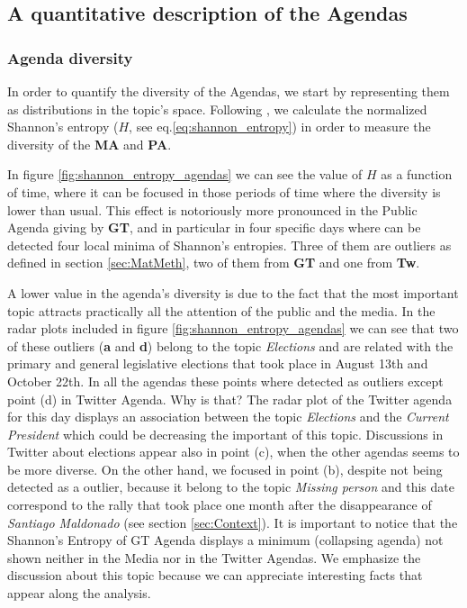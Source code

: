 \documentclass[10pt,letterpaper]{article}
\begin{document}
\subsection*{A quantitative description of the Agendas}

\subsubsection*{Agenda diversity}


\par In order to quantify the diversity of the Agendas, we start by representing them as distributions in the topic's space. 
Following \cite{boydstun2014importance}, we calculate the normalized Shannon's entropy ($H$, see eq.\ref{eq:shannon_entropy}) in order to measure the diversity of the \textbf{MA} and \textbf{PA}.
\par In figure \ref{fig:shannon_entropy_agendas} we can see the value of $H$ as a function of time, where it can be focused in those periods of time where the diversity is lower than usual. This effect is notoriously more pronounced in the Public Agenda giving by \textbf{GT}, and in particular in four specific days  where can be detected four local minima of Shannon's entropies. Three of them are outliers as defined in section \ref{sec:MatMeth}, two of them from \textbf{GT} and one from \textbf{Tw}. 

\par A lower value in the agenda's diversity is due to the fact that the most important topic attracts practically all the attention of the public and the media.
In the radar plots included in figure \ref{fig:shannon_entropy_agendas} we can see that two of these outliers (\textbf{a} and \textbf{d}) belong to the topic \emph{Elections} and are related with the primary and general legislative elections that took place in August 13th and October 22th. 
In all the agendas these points where detected as outliers except point (d) in Twitter Agenda. Why is that? The radar plot of the Twitter agenda for this day displays an association between the topic \emph{Elections} and the \emph{Current President} which could be decreasing the important of this topic.
Discussions in Twitter about elections appear also in point (c), when the other agendas seems to be more diverse. 
On the other hand, we focused in point (b), despite not being detected as a outlier, because it belong to the topic \emph{Missing person} and this date correspond to the rally that took place one month after the disappearance of \emph{Santiago Maldonado} (see section \ref{sec:Context}). It is important to notice that the Shannon's Entropy of GT Agenda displays a minimum (collapsing agenda) not shown neither in the Media nor in the Twitter Agendas.
We emphasize the discussion about this topic because we can appreciate  interesting facts that appear along the analysis.
\end{document}

